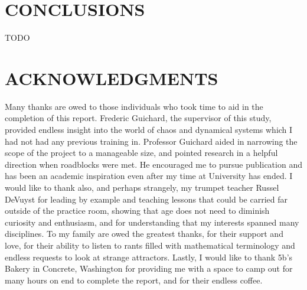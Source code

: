 \documentclass[letterpaper, 10 pt, conference]{ieeeconf}  %
\begin{document}
\section{CONCLUSIONS}
    TODO
    
\section{ACKNOWLEDGMENTS}
		Many thanks are owed to those individuals who took time to aid in the completion of this report. Frederic Guichard, the supervisor of this study, provided endless insight into the world of chaos and dynamical systems which I had not had any previous training in. Professor Guichard aided in narrowing the scope of the project to a manageable size, and pointed research in a helpful direction when roadblocks were met. He encouraged me to pursue publication and has been an academic inspiration even after my time at University has ended. I would like to thank also, and perhaps strangely, my trumpet teacher Russel DeVuyst for leading by example and teaching lessons that could be carried far outside of the practice room, showing that age does not need to diminish curiosity and enthusiasm, and for understanding that my interests spanned many disciplines. To my family are owed the greatest thanks, for their support and love, for their ability to listen to rants filled with mathematical terminology and endless requests to look at strange attractors. Lastly, I would like to thank 5b's Bakery in Concrete, Washington for providing me with a space to camp out for many hours on end to complete the report, and for their endless coffee. 
\end{document}
